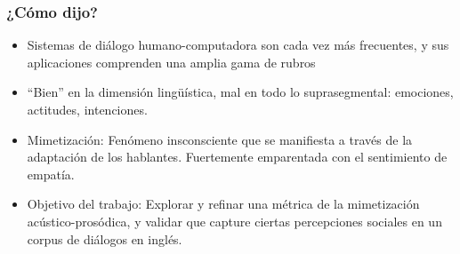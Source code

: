 \begin{frame}
  \frametitle{¿Cómo dijo?}


\begin{itemize}
  \item Sistemas de diálogo humano-computadora son cada vez más frecuentes, y sus aplicaciones comprenden una amplia gama de rubros
  \item ``Bien'' en la dimensión lingüística, mal en todo lo suprasegmental: emociones, actitudes, intenciones.
  \item Mimetización: Fenómeno insconsciente que se manifiesta a través de la adaptación de los hablantes. Fuertemente emparentada con el sentimiento de empatía.
  \item Objetivo del trabajo: Explorar y refinar una métrica de la mimetización acústico-prosódica, y validar que capture ciertas percepciones sociales en un corpus de diálogos en inglés.
\end{itemize}

\end{frame}

